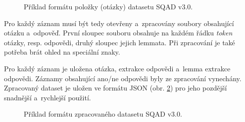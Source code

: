 \begin{figure}[hbt]
	\centering
	\caption{Příklad formátu položky (otázky) datasetu SQAD v3.0.}
	\label{question_format}
\end{figure}

Pro každý záznam musí být tedy otevřeny a~zpracovány soubory obsahující otázku a~odpověď. První sloupec souboru obsahuje na každém řádku \emph{token} otázky, resp. odpovědi, druhý sloupec jejich lemmata. Při zpracování je také potřeba brát ohled na speciální znaky.\par
Pro každý záznam je uložena otázka, extrakce odpovědi a~lemma extrakce odpovědi. Záznamy obsahující ano/ne odpovědi byly ze zpracování vynechány. Zpracovaný dataset je uložen ve formátu JSON (obr. \ref{fig:sqad_processed}) pro jeho pozdější snadnější a~rychlejší použití.

\begin{figure}[hbt]
	\centering
	\caption{Příklad formátu zpracovaného datasetu SQAD v3.0.}
	\label{fig:sqad_processed}
\end{figure}

